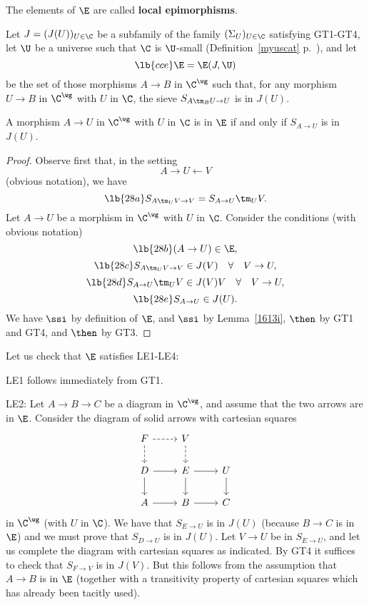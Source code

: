 \documentclass[12pt]{article}
\theoremstyle{remark}
\theoremstyle{definition}
\begin{document}
The elements of $\E$ are called \textbf{local epimorphisms}.

Let $J=(J(U))_{U\in\C}$ be a subfamily of the family $(\Sigma_U)_{U\in\C}$ satisfying GT1\--GT4, let $\U$ be a universe such that $\C$ is $\U$-small (Definition~\ref{myuscat} p.~), and let 
\begin{equation}\lb{cce}
\E=\E(J,\U)
\end{equation} 
be the set of those morphisms $A\to B$ in $\C^\wg$ such that, for any morphism $U\to B$ in $\C^\wg$ with $U$ in $\C$, the sieve $S_{A\tm_BU\to U}$ is in $J(U)$. 

\begin{lem}
A morphism $A\to U$ in $\C^\wg$ with $U$ in $\C$ is in $\E$ if and only if $S_{A\to U}$ is in $J(U)$. 
\end{lem}

\begin{proof}
Observe first that, in the setting 
$$
A\to U\leftarrow V
$$ 
(obvious notation), we have 
\begin{equation}\lb{28a}
S_{A\tm_UV\to V}=S_{A\to U}\tm_UV.
\end{equation} 
Let $A\to U$ be a morphism in $\C^\wg$ with $U$ in $\C$. Consider the conditions (with obvious notation) 
\begin{equation}\lb{28b}
(A\to U)\in\E,
\end{equation}
\begin{equation}\lb{28c}
S_{A\tm_UV\to V}\in J(V)\quad\forall\quad V\to U,
\end{equation}
\begin{equation}\lb{28d}
S_{A\to U}\tm_UV\in J(V)V\quad\forall\quad V\to U,
\end{equation}
\begin{equation}\lb{28e}
S_{A\to U}\in J(U).
\end{equation} 
We have  $\ssi$  by definition of $\E$, and  $\ssi$  by Lemma~\ref{1613i},  $\then$  by GT1 and GT4, and  $\then$  by GT3.
\end{proof}

Let us check that $\E$ satisfies LE1-LE4:

\nn LE1 follows immediately from GT1.

\nn LE2: Let $A\to B\to C$ be a diagram in $\C^\wg$, and assume that the two arrows are in $\E$. Consider the diagram of solid arrows with cartesian squares 
$$
\begin{tikzcd}
F\ar[dashed]{r}\ar[dashed]{d}&V\ar[dashed]{d}\\ 
D\ar{r}\ar{d}&E\ar{r}\ar{d}&U\ar{d}\\ 
A\ar{r}&B\ar{r}&C
\end{tikzcd}
$$
in $\C^\wg$ (with $U$ in $\C$). We have that $S_{E\to U}$ is in $J(U)$ (because $B\to C$ is in $\E$) and we must prove that $S_{D\to U}$ is in $J(U)$. Let $V\to U$ be in $S_{E\to U}$, and let us complete the diagram with cartesian squares as indicated. By GT4 it suffices to check that $S_{F\to V}$ is in $J(V)$. But this follows from the assumption that $A\to B$ is in $\E$ (together with a transitivity property of cartesian squares which has already been tacitly used).
\end{document}
